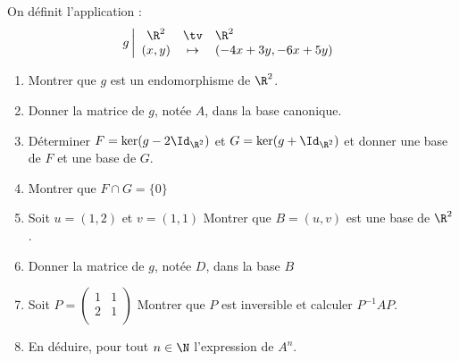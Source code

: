 \documentclass[a4paper, 11pt,reqno]{article}
\begin{document}
\begin{exercice}

On définit l'application : 
$$g \left| \begin{array}{ccl}
\R^2 &\tv& \R^2 \\
(x,y) &\mapsto & (-4x+3y, -6x+5y)
\end{array}\right.$$
\begin{enumerate}

\item Montrer que $g$ est un endomorphisme de $\R^2$.
\item Donner la matrice de $g$, notée $A$,  dans la base canonique. 

\item Déterminer $F =\ker(g-2\Id_{\R^2}) $ et $G =\ker(g+\Id_{\R^2}) $ et donner une base de $F$ et une base de $G$. 
\item Montrer que $F \cap G= \{ 0\}$ 
\item Soit $u =(1,2) $ et  $v= (1 , 1) $ Montrer que $B=(u,v) $ est une base de $\R^2$.
\item Donner la matrice de $g$, notée $D$,  dans la base $B$
\item Soit $P= \begin{pmatrix}
1 & 1\\
2 & 1\\
\end{pmatrix}$
Montrer que $P$ est inversible et calculer $P^{-1} A P$. 
\item En déduire, pour tout $n\in \N$ l'expression de  $A^n$.
\end{enumerate} 
\end{exercice}
\end{document}
